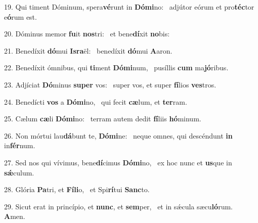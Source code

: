 19. Qui timent Dóminum, spera\textbf{vé}runt in \textbf{Dó}\textbf{mi}no: \ast\  adjútor eórum et pro\textbf{téc}tor e\textbf{ó}rum est.\

20. Dóminus memor \textbf{fu}it \textbf{nos}tri: \ast\  et bene\textbf{dí}xit \textbf{no}bis:\

21. Benedíxit \textbf{dó}mui \textbf{Is}\textbf{ra}ël: \ast\  benedíxit \textbf{dó}mui \textbf{A}aron.\

22. Benedíxit ómnibus, qui \textbf{ti}ment \textbf{Dó}\textbf{mi}num, \ast\  pusíllis \textbf{cum} ma\textbf{jó}ribus.\

23. Adjíciat \textbf{Dó}minus \textbf{su}\textbf{per} vos: \ast\  super vos, et super \textbf{fí}lios \textbf{ves}tros.\

24. Benedícti \textbf{vos} a \textbf{Dó}\textbf{mi}no, \ast\  qui fecit \textbf{cæ}lum, et \textbf{ter}ram.\

25. Cælum \textbf{cæ}li \textbf{Dó}\textbf{mi}no: \ast\  terram autem dedit \textbf{fí}liis \textbf{hó}minum.\

26. Non mórtui lau\textbf{dá}bunt te, \textbf{Dó}\textbf{mi}ne: \ast\  neque omnes, qui descéndunt \textbf{in} in\textbf{fér}num.\

27. Sed nos qui vívimus, bene\textbf{dí}cimus \textbf{Dó}\textbf{mi}no, \ast\  ex hoc nunc et \textbf{us}que in \textbf{sǽ}culum.\

28. Glória \textbf{Pa}tri, et \textbf{Fí}\textbf{li}o, \ast\  et Spi\textbf{rí}tui \textbf{Sanc}to.\

29. Sicut erat in princípio, et \textbf{nunc}, et \textbf{sem}per, \ast\  et in sǽcula sæcu\textbf{ló}rum. \textbf{A}men.\

